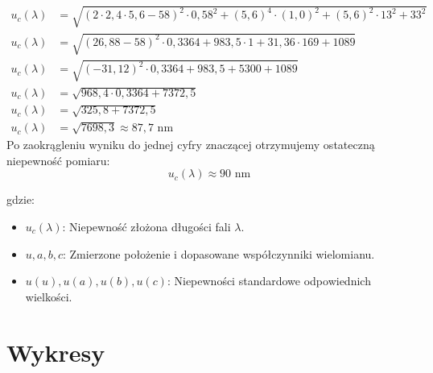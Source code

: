 \documentclass[a4paper,12pt]{article}
\begin{document}
\begin{align*}
    u_c(\lambda) & = \sqrt{ (2 \cdot 2{,}4 \cdot 5{,}6 - 58)^2 \cdot 0{,}58^2 + (5{,}6)^4 \cdot (1{,}0)^2 + (5{,}6)^2 \cdot 13^2 + 33^2 } \\
    u_c(\lambda) & = \sqrt{ (26{,}88 - 58)^2 \cdot 0{,}3364 + 983{,}5 \cdot 1 + 31{,}36 \cdot 169 + 1089 }                                \\
    u_c(\lambda) & = \sqrt{ (-31{,}12)^2 \cdot 0{,}3364 + 983{,}5 + 5300 + 1089 }                                                         \\
    u_c(\lambda) & = \sqrt{ 968{,}4 \cdot 0{,}3364 + 7372{,}5 }                                                                           \\
    u_c(\lambda) & = \sqrt{ 325{,}8 + 7372{,}5 }                                                                                          \\
    u_c(\lambda) & = \sqrt{ 7698{,}3 } \approx 87{,}7 \text{ nm}
\end{align*}
Po zaokrągleniu wyniku do jednej cyfry znaczącej otrzymujemy ostateczną niepewność pomiaru:
$$
    u_c(\lambda) \approx 90 \text{ nm}
$$

gdzie:
\begin{itemize}
    \item $u_c(\lambda)$: Niepewność złożona długości fali $\lambda$.
    \item $u, a, b, c$: Zmierzone położenie i dopasowane współczynniki wielomianu.
    \item $u(u), u(a), u(b), u(c)$: Niepewności standardowe odpowiednich wielkości.
\end{itemize}

\section{Wykresy}
\end{document}
